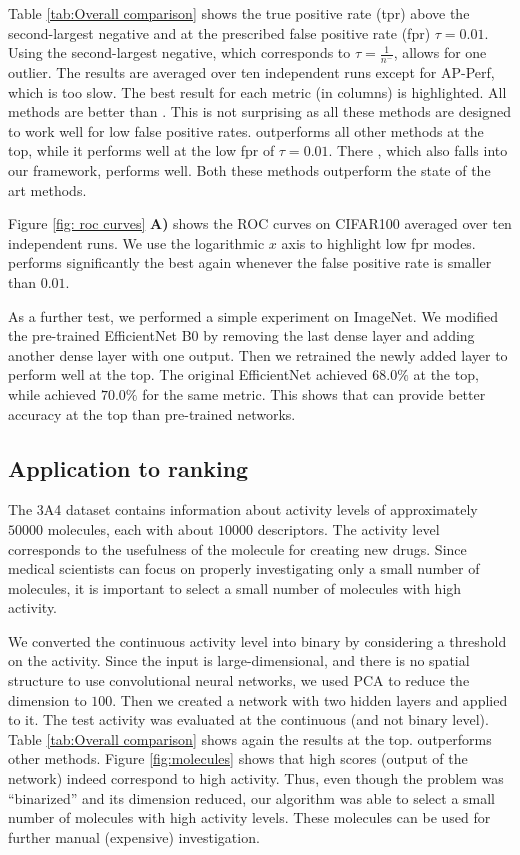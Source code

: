 Table \ref{tab:Overall comparison} shows the true positive rate (tpr) above the second-largest negative and at the prescribed false positive rate (fpr) $\tau=0.01$. Using the second-largest negative, which corresponds to $\tau=\frac{1}{n^-}$, allows for one outlier. The results are averaged over ten independent runs except for AP-Perf, which is too slow. The best result for each metric (in columns) is highlighted. All methods are better than \BaseLine. This is not surprising as all these methods are designed to work well for low false positive rates. \DeepTopPush outperforms all other methods at the top, while it performs well at the low fpr of $\tau=0.01$. There \PatMatNP, which also falls into our framework, performs well. Both these methods outperform the state of the art methods. 

Figure \ref{fig: roc curves} \textbf{A)} shows the ROC curves on CIFAR100 averaged over ten independent runs. We use the logarithmic $x$ axis to highlight low fpr modes. \DeepTopPush performs significantly the best again whenever the false positive rate is smaller than $0.01$.

As a further test, we performed a simple experiment on ImageNet. We modified the pre-trained EfficientNet B0 \cite{tan2019efficientnet} by removing the last dense layer and adding another dense layer with one output. Then we retrained the newly added layer to perform well at the top. The original EfficientNet achieved $68.0\%$ at the top, while \DeepTopPush achieved $70.0\%$ for the same metric. This shows that \DeepTopPush can provide better accuracy at the top than pre-trained networks.

\subsection{Application to ranking}

The 3A4 dataset contains information about activity levels of approximately $50000$ molecules, each with about $10000$ descriptors. The activity level corresponds to the usefulness of the molecule for creating new drugs. Since medical scientists can focus on properly investigating only a small number of molecules, it is important to select a small number of molecules with high activity.

We converted the continuous activity level into binary by considering a threshold on the activity. Since the input is large-dimensional, and there is no spatial structure to use convolutional neural networks, we used PCA to reduce the dimension to $100$. Then we created a network with two hidden layers and applied \DeepTopPush to it. The test activity was evaluated at the continuous (and not binary level). Table \ref{tab:Overall comparison} shows again the results at the top. \DeepTopPush outperforms other methods. Figure \ref{fig:molecules} shows that high scores (output of the network) indeed correspond to high activity. Thus, even though the problem was ``binarized'' and its dimension reduced, our algorithm was able to select a small number of molecules with high activity levels. These molecules can be used for further manual (expensive) investigation.

